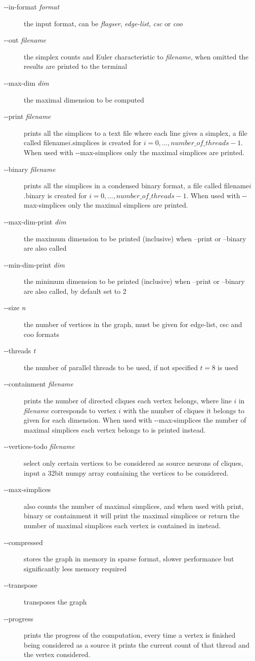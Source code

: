 \documentclass{amsart}
\theoremstyle{definition}
\begin{document}
\enlargethispage{\baselineskip}
\begin{description}
  \item [-{}-in-format \textit{format}] the input format, can be \emph{flagser}, \emph{edge-list}, \emph{csc} or \emph{coo}
  \item [-{}-out \textit{filename}] the simplex counts and Euler characteristic to \textit{filename}, when omitted the results are printed to the terminal
  \item [-{}-max-dim \textit{dim}] the maximal dimension to be computed
  \item [-{}-print \textit{filename}] prints all the simplices to a text file where each line gives a simplex, a file called filename$i$.simplices is created for $i=0,...,number\_of\_threads-1$. When used with -{}-max-simplices only the maximal simplices are printed.
  \item [-{}-binary \textit{filename}] prints all the simplices in a condensed binary format, a file called filename$i$.binary is created for $i=0,...,number\_of\_threads-1$. When used with -{}-max-simplices only the maximal simplices are printed.
  \item [-{}-max-dim-print \textit{dim}] the maximum dimension to be printed (inclusive) when --print or --binary are also called
  \item [-{}-min-dim-print \textit{dim}] the minimum dimension to be printed (inclusive) when --print or --binary are also called, by default set to 2
  \item [-{}-size \textit{n}] the number of vertices in the graph, must be given for edge-list, csc and coo formats
  \item [-{}-threads \textit{t}] the number of parallel threads to be used, if not specified $t=8$ is used
  \item [-{}-containment \textit{filename}] prints the number of directed cliques each vertex belongs, where line $i$ in \textit{filename} corresponds to vertex $i$ with the number of cliques it belongs to given for each dimension. When used with -{}-max-simplices the number of maximal simplices each vertex belongs to is printed instead.
  \item [-{}-vertices-todo \textit{filename}] select only certain vertices to be considered as source neurons of cliques, input a 32bit numpy array containing the vertices to be considered.
  \item [-{}-max-simplices] also counts the number of maximal simplices, and when used with print, binary or containment it will print the maximal simplices or return the number of maximal simplices each vertex is contained in instead.
  \item [-{}-compressed] stores the graph in memory in sparse format, slower performance but significantly less memory required
  \item [-{}-transpose] transposes the graph
  \item [-{}-progress] prints the progress of the computation, every time a vertex is finished being considered as a source it prints the current count of that thread and the vertex considered.

\end{description}
\end{document}
